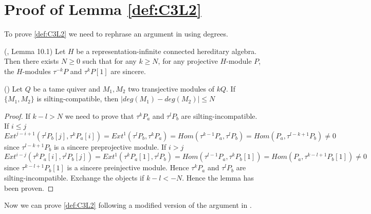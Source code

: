 \section{Proof of Lemma \ref{def:C3L2}}
\indent To prove \ref{def:C3L2} we need to rephrase an argument in \cite{BDP13} using degrees.
\begin{lemma}
(\cite{BDP13}, Lemma 10.1) Let $H$ be a representation-infinite connected hereditary algebra. Then there exists $N\geq 0$ such that for any $k\geq N$, for any projective $H$-module $P$, the $H$-modules $\tau^{-k}P$ and $\tau^kP[1]$ are sincere.
\end{lemma}
\begin{lemma}
(\cite{BDP13}) Let $Q$ be a tame quiver and $M_1,M_2$ two transjective modules of $kQ$. If $\{M_1,M_2\}$ is silting-compatible, then $|deg(M_1)-deg(M_2)|\leq N$ 
\end{lemma}
\begin{proof}
If $k-l>N$ we need to prove that $\tau^kP_a$ and $\tau^lP_b$ are silting-incompatible. If $i\leq j$ $Ext^{j-i+1}(\tau^lP_b[j],\tau^kP_a[i])=Ext^1(\tau^lP_b,\tau^kP_a)=Hom(\tau^{k-1}P_a,\tau^l P_b)=Hom(P_a,\tau^{l-k+1}P_b)\neq 0$ since $\tau^{l-k+1}P_b$ is a sincere preprojective module. If $i>j$ $Ext^{i-j}(\tau^kP_a[i],\tau^lP_b[j])=Ext^1(\tau^kP_a[1],\tau^lP_b)=Hom(\tau^{l-1}P_a,\tau^k P_b[1])=Hom(P_a,\tau^{k-l+1}P_b[1])\neq 0$ since $\tau^{k-l+1}P_b[1]$ is a sincere preinjective module. Hence $\tau^kP_a$ and $\tau^lP_b$ are silting-incompatible. Exchange the objects if $k-l<-N$. Hence the lemma has been proven.
\end{proof}
\indent Now we can prove \ref{def:C3L2} following a modified version of the argument in \cite{BDP13}.
